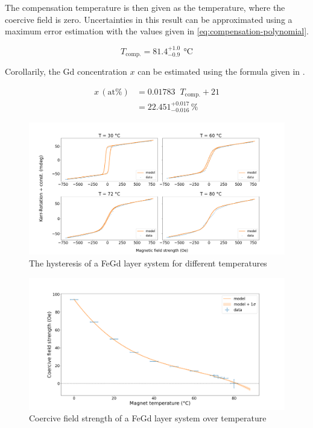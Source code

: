 The compensation temperature is then given as the temperature, where the coercive
field is zero. Uncertainties in this result can be approximated using a maximum
error estimation with the values given in \autoref{eq:compensation-polynomial}.

\begin{equation*}
	T_\text{comp.} = 81.4^{+1.0}_{-0.9}\,\SI{}{\celsius}
\end{equation*}

Corollarily, the Gd concentration $x$ can be estimated using the formula given in 
\cite{lab-manual}.

\begin{align*}
\label{eq:Gd-concentration}
	x\,(\text{at} \%) &= 0.01783\;\;T_\text{comp.} + 21 \\[7pt]
	&= 22.451^{+0.017}_{-0.016}\,\%
\end{align*}

\begin{figure}
	\centering
	\includegraphics[width=1.0\textwidth]{./fig/ferrimagnet_measurement.png}
	\caption{The hysteresis of a FeGd layer system for different temperatures}
	\label{fig:ferrimagnet-measurement}
\end{figure}



\begin{figure}
	\centering
	\includegraphics[width=1.0\textwidth]{./fig/ferrimagnet_t_comp.png}
	\caption{Coercive field strength of a FeGd layer system over temperature}
	\label{fig:compensation-temperature}
\end{figure}
